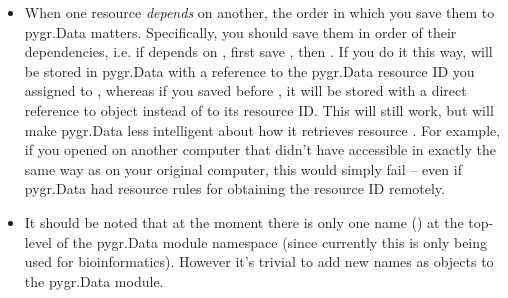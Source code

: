 \documentclass{howto}
\begin{document}
\begin{itemize}
\item When one resource {\em depends} on another, the order in which you
save them to pygr.Data matters.  Specifically, you should save them in
order of their dependencies, i.e. if  depends on , first save
, then .  If you do it this way,  will be stored
in pygr.Data with a reference to the pygr.Data resource ID you assigned
to , whereas if you saved  before , it will be stored
with a direct reference to object  instead of to its resource ID.
This will still work, but will make pygr.Data less intelligent about how
it retrieves resource .  For example, if you opened  on
another computer that didn't have  accessible in exactly the same
way as on your original computer, this would simply fail -- even if
pygr.Data had resource rules for obtaining the  resource ID
remotely.

\item It should be noted that at the moment there is only one name
() at the top-level of the pygr.Data module namespace (since currently
this is only being used for bioinformatics).  However it's 
trivial to add new names as  objects to the pygr.Data
module.

\end{itemize}
\end{document}
